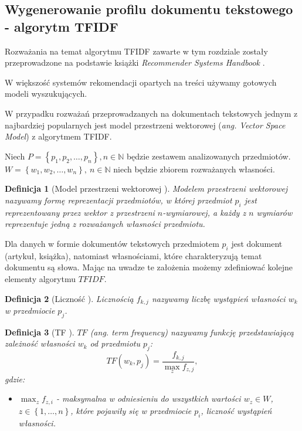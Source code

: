 \documentclass[12pt,a4paper]{report}
\newtheorem{df}{Definicja}[chapter]
\newcommand{\set}[1]{\left\lbrace {#1} \right\rbrace}
\newcommand{\setN}{\mathbb{N}}
\newcommand{\setPrzedmioty}{\mathit{P}}
\newcommand{\setWlasnosci}{\mathit{W}}
\begin{document}
\subsection{Wygenerowanie profilu dokumentu tekstowego - algorytm TFIDF}
Rozważania na temat algorytmu TFIDF zawarte w tym rozdziale zostały przeprowadzone na podstawie książki \textit{Recommender Systems Handbook} {\citep[Sec 3.3.1.1]{rsh}}.
\bigskip
\bigskip

W większość systemów rekomendacji opartych na treści używamy gotowych modeli wyszukujących. 

W przypadku rozważań przeprowadzanych na dokumentach tekstowych jednym z najbardziej popularnych jest model przestrzeni wektorowej (\textit{ang. Vector Space Model}) z algorytmem TFIDF. 
\bigskip

Niech $\setPrzedmioty = \set{p_1, p_2, \ldots ,p_n}, n\in \setN$ będzie zestawem analizowanych przedmiotów. $W = \set{w_1, w_2, \ldots ,w_n}, \: n\in \setN $ niech będzie zbiorem rozważanych własności.

\begin{df}[Model przestrzeni wektorowej {\citep[Sec 3.3.1.1]{rsh}}]
Modelem przestrzeni wektorowej nazywamy formę reprezentacji przedmiotów, w której przedmiot $p_i$ jest reprezentowany przez wektor z przestrzeni $n$-wymiarowej, a każdy z $n$ wymiarów reprezentuje jedną z rozważanych własności przedmiotu. 
\end{df}

Dla danych w formie dokumentów tekstowych przedmiotem $p_i$ jest dokument (artykuł, książka), natomiast własnościami, które charakteryzują temat dokumentu są słowa. Mając na uwadze te założenia możemy zdefiniować kolejne elementy algorytmu $TFIDF$.

\begin{df}[Liczność {\citep[Sec 3.3.1.1]{rsh}}]
Licznością $f_{k,j}$ nazywamy liczbę wystąpień własności $w_k$ w przedmiocie $p_j$.
\end{df}

\begin{df}[TF {\citep[Sec 3.3.1.1]{rsh}}]
$TF$ (ang. \textit{term frequency}) nazywamy funkcję przedstawiającą zależność własności $w_k$ od przedmiotu $p_j$:
$$
TF(w_k, p_j)=\frac{f_{k,j}}{\max_{z}f_{z,j}},
$$
gdzie:
\begin{itemize}
\item $\max_{z}f_{z,i}$ - maksymalna w odniesieniu do wszystkich wartości $w_z \in \setWlasnosci$, $z \in \set{1, \ldots, n}$, które pojawiły się w przedmiocie $p_i$, liczność wystąpień własności. 
\end{itemize}
\end{df}
\end{document}
